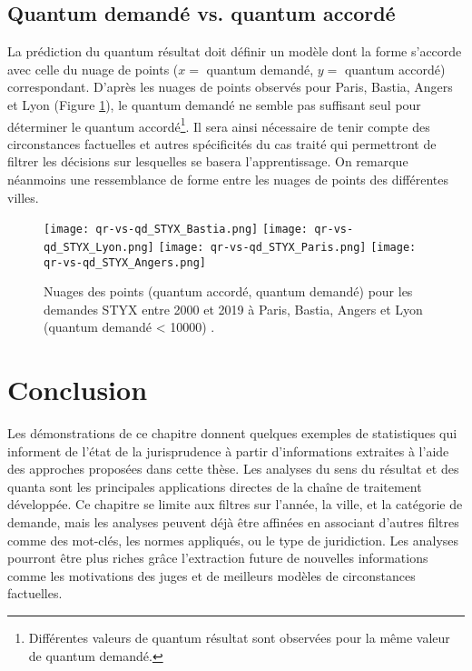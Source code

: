 \subsection{Quantum demandé vs. quantum accordé}
La prédiction du quantum résultat doit définir un modèle dont la forme s'accorde avec celle du nuage de points ($x=$ quantum demandé, $y=$ quantum accordé) correspondant. D'après les nuages de points observés pour Paris, Bastia, Angers et Lyon (Figure \ref{fig:demo:qr-vs-qd-styx-compare-ville}), le quantum demandé ne semble pas suffisant seul pour déterminer le quantum accordé\footnote{Différentes valeurs de quantum résultat sont observées pour la même valeur de quantum demandé.}. Il sera ainsi nécessaire de tenir compte des circonstances factuelles et autres spécificités du cas traité qui permettront de filtrer les décisions sur lesquelles se basera l'apprentissage. On remarque néanmoins une ressemblance de forme entre les nuages de points des différentes villes. 

\begin{figure}[!htb]
	\centering 
	\texttt{[image: qr-vs-qd\_STYX\_Bastia.png]}
	\texttt{[image: qr-vs-qd\_STYX\_Lyon.png]}
	\texttt{[image: qr-vs-qd\_STYX\_Paris.png]}
	\texttt{[image: qr-vs-qd\_STYX\_Angers.png]}
	\caption{Nuages des points (quantum accordé, quantum demandé) pour les demandes STYX entre 2000 et 2019 à Paris, Bastia, Angers et Lyon (quantum demandé < 10000) .}\label{fig:demo:qr-vs-qd-styx-compare-ville}
\end{figure}

\section{Conclusion}
\label{sec:demo:conclusion}
Les démonstrations de ce chapitre donnent quelques exemples de statistiques qui informent de l'état de la jurisprudence à partir d'informations extraites à l'aide des approches proposées dans cette thèse. Les analyses du sens du résultat et des quanta sont les principales applications directes de la chaîne de traitement développée. Ce chapitre se limite aux filtres sur l'année, la ville, et la catégorie de demande, mais les analyses peuvent déjà être affinées en associant d'autres filtres comme  des mot-clés,  les normes appliqués, ou le type de juridiction. Les analyses pourront être plus riches grâce l'extraction future de nouvelles informations comme les motivations des juges et de meilleurs modèles de circonstances factuelles.
